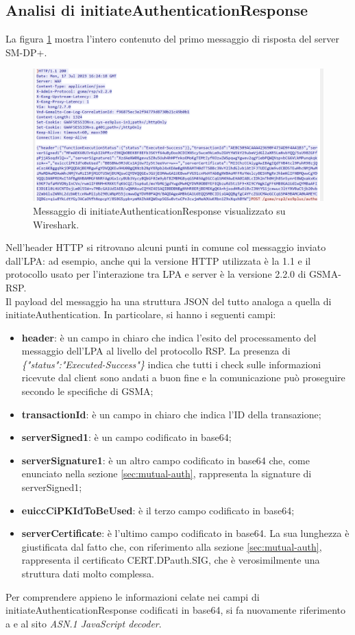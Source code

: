 \documentclass[10pt, oneside]{book}
\begin{document}
\subsection{Analisi di initiateAuthenticationResponse}
La figura \ref{fig:msg2-stream-pcap} mostra l'intero contenuto del primo messaggio di risposta del server SM-DP+.\\
\begin{figure}
\includegraphics[width=\linewidth]{msg2-stream-pcap.png}
\caption{Messaggio di initiateAuthenticationResponse visualizzato su Wireshark.}
\label{fig:msg2-stream-pcap}
\end{figure}
Nell'header HTTP si ritrovano alcuni punti in comune col messaggio inviato dall'LPA: ad esempio, anche qui la versione HTTP utilizzata è la 1.1 e il protocollo usato per l'interazione tra LPA e server è la versione 2.2.0 di GSMA-RSP.\\

Il payload del messaggio ha una struttura JSON del tutto analoga a quella di initiateAuthentication. In particolare, si hanno i seguenti campi:
\begin{itemize}
\item \textbf{header}: è un campo in chiaro che indica l'esito del processamento del messaggio dell'LPA al livello del protocollo RSP. La presenza di \textit{\{"status":"Executed-Success"\}} indica che tutti i check sulle informazioni ricevute dal client sono andati a buon fine e la comunicazione può proseguire secondo le specifiche di GSMA;
\item \textbf{transactionId}: è un campo in chiaro che indica l'ID della transazione;
\item \textbf{serverSigned1}: è un campo codificato in base64;
\item \textbf{serverSignature1}: è un altro campo codificato in base64 che, come enunciato nella sezione \ref{sec:mutual-auth}, rappresenta la signature di serverSigned1;
\item \textbf{euiccCiPKIdToBeUsed}: è il terzo campo codificato in base64;
\item \textbf{serverCertificate}: è l'ultimo campo codificato in base64. La sua lunghezza è giustificata dal fatto che, con riferimento alla sezione \ref{sec:mutual-auth}, rappresenta il certificato CERT.DPauth.SIG, che è verosimilmente una struttura dati molto complessa.
\end{itemize}
Per comprendere appieno le informazioni celate nei campi di initiateAuthenticationResponse codificati in base64, si fa nuovamente riferimento a \cite{RSP-definitions} e al sito \textit{ASN.1 JavaScript decoder}.\\
\end{document}
